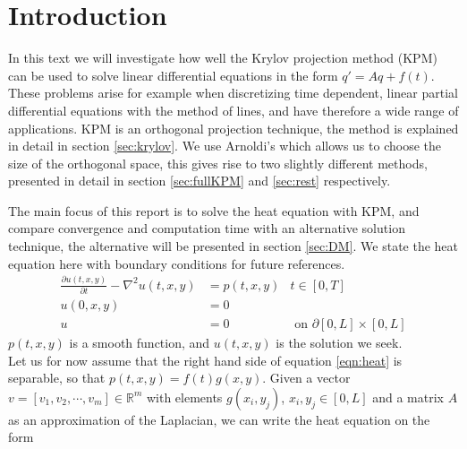 \chapter{Introduction}%

In this text we will investigate how well the Krylov projection method (KPM) can be used to solve linear differential equations in the form $q'=Aq+f(t)$. These problems arise for example when discretizing time dependent, linear partial differential equations with the method of lines, and have therefore a wide range of applications. 
KPM is an orthogonal projection technique, the method is explained in detail in section \ref{sec:krylov}. We use Arnoldi's which allows us to choose the size of the orthogonal space, this gives rise to two slightly different methods, presented in detail in section \ref{sec:fullKPM} and \ref{sec:rest} respectively.

The main focus of this report is to solve the heat equation with KPM, and compare convergence and computation time with an alternative solution technique, the alternative will be presented in section \ref{sec:DM}.
We state the heat equation here with boundary conditions for future references. \\
\begin{equation} \label{eqn:heat}
\begin{aligned}
\frac{\partial u(t,x,y)}{\partial t} - \nabla^2 u(t,x,y) &= p(t,x,y) & t \in [0,T]\\
u(0,x,y) &= 0 \\
u & = 0 			&\text{ on } \partial [0,L] \times [0,L]
\end{aligned}
\end{equation}
$p(t,x,y)$ is a smooth function, and $u(t,x,y)$ is the solution we seek.\\

Let us for now assume that the right hand side of equation \eqref{eqn:heat} is separable, so that $p(t,x,y) = f(t)g(x,y) $. 
Given a vector $v = [v_1,v_2, \cdots, v_m] \in \mathbb{R}^m $ with elements $ g(x_i,y_j)$, $x_i,y_j \in [0,L]$ and a matrix $A$ as an approximation of the Laplacian, we can write the heat equation on the form


